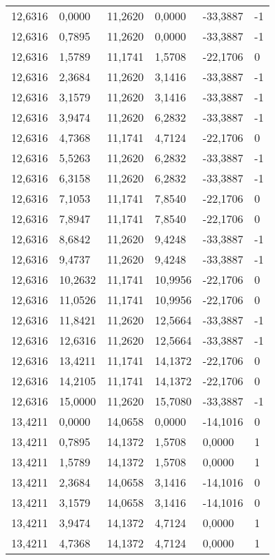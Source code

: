 \begin{longtable}{@{}llllll@{}}
		12,6316 & 0,0000  & 11,2620 & 0,0000  & -33,3887 & -1 \\
		12,6316 & 0,7895  & 11,2620 & 0,0000  & -33,3887 & -1 \\
		12,6316 & 1,5789  & 11,1741 & 1,5708  & -22,1706 & 0  \\
		12,6316 & 2,3684  & 11,2620 & 3,1416  & -33,3887 & -1 \\
		12,6316 & 3,1579  & 11,2620 & 3,1416  & -33,3887 & -1 \\
		12,6316 & 3,9474  & 11,2620 & 6,2832  & -33,3887 & -1 \\
		12,6316 & 4,7368  & 11,1741 & 4,7124  & -22,1706 & 0  \\
		12,6316 & 5,5263  & 11,2620 & 6,2832  & -33,3887 & -1 \\
		12,6316 & 6,3158  & 11,2620 & 6,2832  & -33,3887 & -1 \\
		12,6316 & 7,1053  & 11,1741 & 7,8540  & -22,1706 & 0  \\
		12,6316 & 7,8947  & 11,1741 & 7,8540  & -22,1706 & 0  \\
		12,6316 & 8,6842  & 11,2620 & 9,4248  & -33,3887 & -1 \\
		12,6316 & 9,4737  & 11,2620 & 9,4248  & -33,3887 & -1 \\
		12,6316 & 10,2632 & 11,1741 & 10,9956 & -22,1706 & 0  \\
		12,6316 & 11,0526 & 11,1741 & 10,9956 & -22,1706 & 0  \\
		12,6316 & 11,8421 & 11,2620 & 12,5664 & -33,3887 & -1 \\
		12,6316 & 12,6316 & 11,2620 & 12,5664 & -33,3887 & -1 \\
		12,6316 & 13,4211 & 11,1741 & 14,1372 & -22,1706 & 0  \\
		12,6316 & 14,2105 & 11,1741 & 14,1372 & -22,1706 & 0  \\
		12,6316 & 15,0000 & 11,2620 & 15,7080 & -33,3887 & -1 \\
		13,4211 & 0,0000  & 14,0658 & 0,0000  & -14,1016 & 0  \\
		13,4211 & 0,7895  & 14,1372 & 1,5708  & 0,0000   & 1  \\
		13,4211 & 1,5789  & 14,1372 & 1,5708  & 0,0000   & 1  \\
		13,4211 & 2,3684  & 14,0658 & 3,1416  & -14,1016 & 0  \\
		13,4211 & 3,1579  & 14,0658 & 3,1416  & -14,1016 & 0  \\
		13,4211 & 3,9474  & 14,1372 & 4,7124  & 0,0000   & 1  \\
		13,4211 & 4,7368  & 14,1372 & 4,7124  & 0,0000   & 1  \\

\end{longtable}
